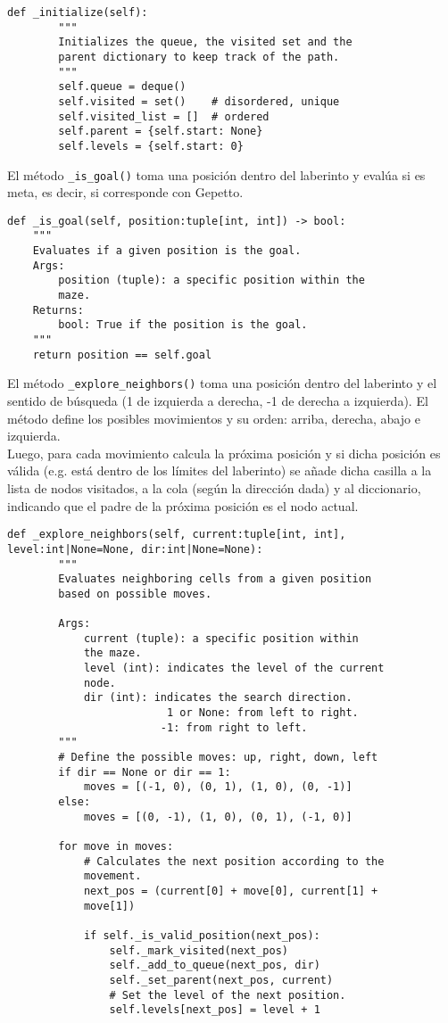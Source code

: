 \begin{lstlisting}
def _initialize(self):
        """
        Initializes the queue, the visited set and the
        parent dictionary to keep track of the path.
        """
        self.queue = deque()
        self.visited = set()    # disordered, unique
        self.visited_list = []  # ordered
        self.parent = {self.start: None}
        self.levels = {self.start: 0}
\end{lstlisting}
El método \lstinline{_is_goal()} toma una posición dentro del laberinto y evalúa si es meta, es decir, si corresponde con Gepetto.\\
\begin{lstlisting}
def _is_goal(self, position:tuple[int, int]) -> bool:
    """
    Evaluates if a given position is the goal.
    Args:
        position (tuple): a specific position within the
        maze.
    Returns:
        bool: True if the position is the goal.
    """
    return position == self.goal
\end{lstlisting}
\clearpage
El método \lstinline{_explore_neighbors()} toma una posición dentro del laberinto y el sentido de búsqueda (1 de izquierda a derecha, -1 de derecha a izquierda). El método define los posibles movimientos y su orden: arriba, derecha, abajo e izquierda.
\\\newline
Luego, para cada movimiento calcula la próxima posición y si dicha posición es válida (e.g. está dentro de los límites del laberinto) se añade dicha casilla a la lista de nodos visitados, a la cola (según la dirección dada) y al diccionario, indicando que el padre de la próxima posición es el nodo actual.\\
\begin{lstlisting}
def _explore_neighbors(self, current:tuple[int, int],
level:int|None=None, dir:int|None=None):
        """
        Evaluates neighboring cells from a given position
        based on possible moves.

        Args:
            current (tuple): a specific position within 
            the maze.
            level (int): indicates the level of the current
            node.
            dir (int): indicates the search direction.
                         1 or None: from left to right.
                        -1: from right to left.
        """
        # Define the possible moves: up, right, down, left
        if dir == None or dir == 1:
            moves = [(-1, 0), (0, 1), (1, 0), (0, -1)]
        else:
            moves = [(0, -1), (1, 0), (0, 1), (-1, 0)]

        for move in moves:
            # Calculates the next position according to the
            movement.
            next_pos = (current[0] + move[0], current[1] +
            move[1])

            if self._is_valid_position(next_pos):
                self._mark_visited(next_pos)
                self._add_to_queue(next_pos, dir)
                self._set_parent(next_pos, current)
                # Set the level of the next position.
                self.levels[next_pos] = level + 1
                
\end{lstlisting}
